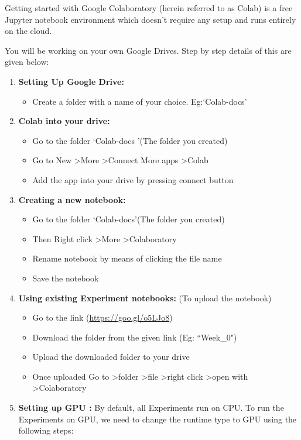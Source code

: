 \documentclass{book}
\begin{document}
Getting started with Google Colaboratory (herein referred to as Colab) is a free Jupyter notebook environment which doesn\rq t require any setup and runs entirely on the cloud.

You will be working on your own Google Drives. Step by step details of this are given below:

\begin{enumerate}
\item \textbf{Setting Up Google Drive:}
	\begin{itemize}
		\item  Create a folder with a name of your choice. Eg:\lq Colab-docs\rq
	\end{itemize}
\item \textbf{Colab into your drive:}
	\begin{itemize}
\item Go to the folder \lq Colab-docs \rq (The folder you created)
\item Go to New \textgreater More \textgreater Connect More apps \textgreater Colab
\item Add the app into your drive by pressing connect button
	\end{itemize}
\item \textbf{Creating a new notebook:}
	\begin{itemize}
		\item Go to the folder \lq Colab-docs\rq (The folder you created)
		\item Then Right click \textgreater More \textgreater Colaboratory
		\item Rename notebook by means of clicking the file name
		\item Save the notebook
	\end{itemize}
\item \textbf{Using existing Experiment notebooks:} (To upload the notebook)
	\begin{itemize}
		\item Go to the link (\url{https://goo.gl/o5LJo8})
		\item Download the folder from the given link (Eg: ``Week\_0")
		\item Upload the downloaded folder to your drive
		\item Once uploaded Go to \textgreater folder \textgreater file \textgreater right click \textgreater open with \textgreater Colaboratory
	\end{itemize}
\item \textbf{Setting up GPU :} By default, all Experiments run on CPU. To run the Experiments on GPU, we need to change the runtime type to GPU using the following steps:

\end{enumerate}
\end{document}
